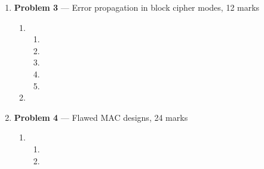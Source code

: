 \documentclass[11pt]{article}
\theoremstyle{definition}
\begin{document}
\begin{enumerate}
\begin{enumerate}
\item %

\item %

\begin{enumerate}
\item %

\item %
\end{enumerate}

\item %

\begin{enumerate}
\item %

\item %
\end{enumerate}
\end{enumerate}


\item[] \textbf{Problem 3} --- Error propagation in block cipher modes, 12 marks

\begin{enumerate}
\item %

\begin{enumerate}
\item %

\item %

\item %

\item %

\item %

\end{enumerate}

\item %

\end{enumerate}


\item[] \textbf{Problem 4} --- Flawed MAC designs, 24 marks

\begin{enumerate}

\item %

\begin{enumerate}
\item %

\item %
\end{enumerate}


\end{enumerate}
\end{enumerate}
\end{document}
